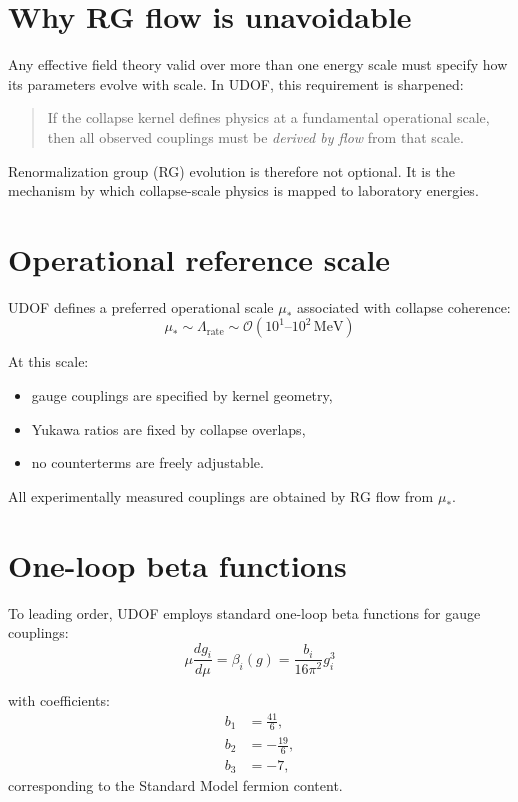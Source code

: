 \documentclass[11pt]{book}
\begin{document}
\section{Why RG flow is unavoidable}

Any effective field theory valid over more than one energy scale must
specify how its parameters evolve with scale.
In UDOF, this requirement is sharpened:

\begin{quote}
If the collapse kernel defines physics at a fundamental operational scale,
then all observed couplings must be \emph{derived by flow} from that scale.
\end{quote}

Renormalization group (RG) evolution is therefore not optional.
It is the mechanism by which collapse-scale physics is mapped to laboratory
energies.

\section{Operational reference scale}

UDOF defines a preferred operational scale $\mu_\ast$ associated with
collapse coherence:
\begin{equation}
\mu_\ast \sim \Lambda_{\mathrm{rate}} \sim \mathcal{O}(10^1\text{--}10^2\,\mathrm{MeV})
\end{equation}

At this scale:
\begin{itemize}
\item gauge couplings are specified by kernel geometry,
\item Yukawa ratios are fixed by collapse overlaps,
\item no counterterms are freely adjustable.
\end{itemize}

All experimentally measured couplings are obtained by RG flow from $\mu_\ast$.

\section{One-loop beta functions}

To leading order, UDOF employs standard one-loop beta functions for
gauge couplings:
\begin{equation}
\mu \frac{d g_i}{d\mu}
=
\beta_i(g)
=
\frac{b_i}{16\pi^2} g_i^3
\end{equation}

with coefficients:
\begin{align}
b_1 &= \frac{41}{6}, \\
b_2 &= -\frac{19}{6}, \\
b_3 &= -7,
\end{align}
corresponding to the Standard Model fermion content.
\end{document}
